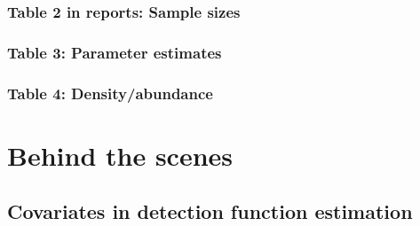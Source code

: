 \documentclass[
]{book}
\newenvironment{Shaded}{\begin{snugshade}}{\end{snugshade}}
\newcommand{\DataTypeTok}[1]{\textcolor[rgb]{0.13,0.29,0.53}{#1}}
\newcommand{\KeywordTok}[1]{\textcolor[rgb]{0.13,0.29,0.53}{\textbf{#1}}}
\newcommand{\NormalTok}[1]{#1}
\newcommand{\OperatorTok}[1]{\textcolor[rgb]{0.81,0.36,0.00}{\textbf{#1}}}
\newcommand{\StringTok}[1]{\textcolor[rgb]{0.31,0.60,0.02}{#1}}
\begin{document}
\hypertarget{table-2-in-reports-sample-sizes}{%
\subsubsection*{Table 2 in reports: Sample sizes}\label{table-2-in-reports-sample-sizes}}

\begin{Shaded}
\end{Shaded}

\hypertarget{table-3-parameter-estimates}{%
\subsubsection*{Table 3: Parameter estimates}\label{table-3-parameter-estimates}}

\hypertarget{table-4-densityabundance}{%
\subsubsection*{Table 4: Density/abundance}\label{table-4-densityabundance}}

\hypertarget{behind-the-scenes-1}{%
\section*{Behind the scenes}\label{behind-the-scenes-1}}

\hypertarget{covariates-in-detection-function-estimation}{%
\subsection*{Covariates in detection function estimation}\label{covariates-in-detection-function-estimation}}
\end{document}
